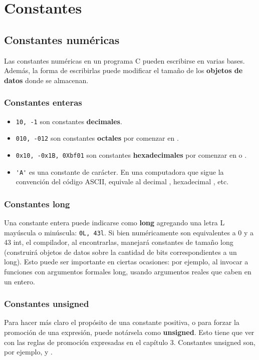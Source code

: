 \chapter{Constantes}
\label{tc-constantes}
\section{Constantes numéricas}

Las constantes numéricas en un programa C pueden escribirse en varias bases. Además, la forma de escribirlas puede modificar el tamaño de los \textbf{objetos de datos} donde se almacenan.

\subsection{Constantes enteras}
\begin{itemize}
	\item \lstinline{10, -1} son constantes \textbf{decimales}.
	\item \lstinline{010, -012} son constantes \textbf{octales} por comenzar en .
	\item \lstinline{0x10, -0x1B, 0Xbf01} son constantes \textbf{hexadecimales} por comenzar en  o .
	\item \lstinline{'A'} es una constante de carácter. En una computadora que sigue la convención del código ASCII,
equivale al decimal , hexadecimal , etc.
\end{itemize}


\subsection{Constantes long} 
Una constante entera puede indicarse como \textbf{long} agregando una letra L mayúscula o minúscula: \lstinline{0L, 43l}.
Si bien numéricamente son equivalentes a 0 y a 43 int, el compilador, al encontrarlas, manejará
constantes de tamaño long (construirá objetos de datos sobre la cantidad de bits correspondientes a un
long). Esto puede ser importante en ciertas ocasiones: por ejemplo, al invocar a funciones con
argumentos formales long, usando argumentos reales que caben en un entero.
	
\subsection{Constantes unsigned}
Para hacer más claro el propósito de una constante positiva, o para forzar la promoción de una
expresión, puede notársela como \textbf{unsigned}. Esto tiene que ver con las reglas de promoción expresadas
en el capítulo 3. Constantes unsigned son, por ejemplo,  y . 

